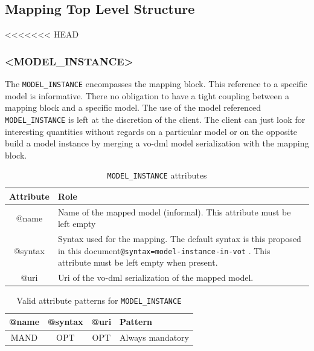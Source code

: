 \documentclass[11pt,a4paper]{ivoa}
\begin{document}
%
%

\subsection{Mapping Top Level Structure}
%
%

<<<<<<< HEAD
\subsubsection{<MODEL\_INSTANCE>}

The  \texttt{MODEL\_INSTANCE}  encompasses the mapping block. 
This reference to a specific model is informative. There no obligation to have a tight coupling between a mapping block and a specific model. The use of the model referenced  \texttt{MODEL\_INSTANCE}  is left at the discretion of the client. The client can just look for interesting quantities without regards on a particular model or on the opposite build a model instance by merging a vo-dml model serialization with the mapping block.


\begin{table}[!htbp]
\small
\centering
\begin{tabulary}{\linewidth}{|c|J|}       
       \hline 
            \textbf{Attribute} & 
            \textbf {Role}\\
       \hline         \hline  
            @name  & 
            Name of the mapped model (informal).  This attribute must be left empty  \\
       \hline 
            @syntax  & 
            Syntax used for the mapping. The default syntax  is this proposed in this document\texttt{@syntax=model-instance-in-vot} . This attribute must be left empty when present.\\
       \hline 
            @uri  & 
            Uri of the vo-dml serialization of the mapped model. \\
       \hline 
     \end{tabulary}
     \caption{\texttt{MODEL\_INSTANCE} attributes} 
     \label{tbl:model-att}
 \end{table}

\begin{table}[!htbp]
\small
\centering
\begin{tabulary}{\linewidth}{|c|c|c|J|}
    \hline 
        \textbf{@name} &        
        \textbf{@syntax} &       
        \textbf{@uri} &
        \textbf{Pattern}\\
    \hline      \hline  
        MAND &           
        OPT &           
        OPT &   
        Always mandatory\\
   \hline 
\end{tabulary}
     \caption{Valid attribute patterns for  \texttt{MODEL\_INSTANCE}} 
     \label{tbl:model-pattern}
 \end{table}
\FloatBarrier
\end{document}
